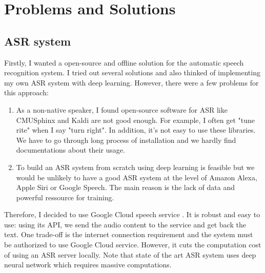 \section{Problems and Solutions}
\subsection{ASR system}
Firstly, I wanted a open-source and offline solution for the automatic speech recognition system. I tried out several solutions and also thinked of implementing my own ASR system with deep learning. However, there were a few problems for this approach:
\begin{enumerate}
	\item As a non-native speaker, I found open-source software for ASR like CMUSphinx \cite{CMUSphinx:2017} and Kaldi \cite{Kaldi:2017} are not good enough. For example, I often get "tune rite" when I say "turn right". In addition, it's not easy to use these libraries. We have to go through long process of installation and we hardly find documentations about their usage.
	\item To build an ASR system from scratch using deep learning is feasible but we would be unlikely to have a good ASR system at the level of Amazon Alexa, Apple Siri or Google Speech. The main reason is the lack of data and powerful ressource for training.
\end{enumerate}
Therefore, I decided to use Google Cloud speech service \cite{GoogleCloud:2017}. It is robust and easy to use: using its API, we send the audio content to the service and get back the text. One trade-off is the internet connection requirement and the system must be authorized to use Google Cloud service. However, it cuts the computation cost of using an ASR server locally. Note that state of the art ASR system uses deep neural network which requires massive computations.

